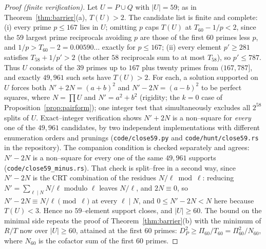 \documentclass[11pt]{article}
\theoremstyle{definition}
\begin{document}
\begin{proof}[Proof (finite verification)]
Let $U=P\cup Q$ with $|U|=59$; as in Theorem~\ref{thm:barrier}(a), $T(U)>2$. The candidate list is
finite and complete: \textup{(i)} every prime $p\le167$ lies in $U$; omitting $p$ caps $T(U)$ at
$T_{60}-1/p<2$, since the $59$ largest prime reciprocals avoiding $p$ are those of the first $60$
primes less $p$, and $1/p>T_{60}-2=0.00590\ldots$ exactly for $p\le167$; \textup{(ii)} every element
$p'\ge281$ satisfies $T_{58}+1/p'>2$ (the other $58$ reciprocals sum to at most $T_{58}$), so
$p'\le787$. Thus $U$ consists of the $39$ primes up to $167$ plus twenty primes from
$(167,787]$, and exactly $49{,}961$ such sets have $T(U)>2$. For each, a solution supported on $U$
forces both $N'+2N=(a+b)^2$ and $N'-2N=(a-b)^2$ to be perfect squares, where $N=\prod U$ and
$N'=a^2+b^2$ (rigidity; the $k=0$ case of Proposition~\ref{prop:pairform}); one integer test that
simultaneously excludes all $2^{58}$ splits of $U$. Exact--integer verification shows $N'+2N$ is a
non--square for \emph{every} one of the $49{,}961$ candidates, by two independent implementations
with different enumeration orders and prunings (\texttt{code/close59.py} and
\texttt{code/hunt/close59.rs} in the repository). The companion condition is checked separately and
agrees: $N'-2N$ is a non--square for every one of the same $49{,}961$ supports
\textup{(\texttt{code/close59\_minus.rs})}. That check is split--free in a second way, since
$N'-2N$ is the CRT combination of the residues $N/\ell\bmod\ell$: reducing $N'=\sum_{\ell\mid N}N/\ell$
modulo $\ell$ leaves $N/\ell$, and $2N\equiv0$, so $N'-2N\equiv N/\ell\pmod\ell$ at every $\ell\mid N$,
and $0\le N'-2N<N$ here because $T(U)<3$. Hence no $59$--element support closes, and
$|U|\ge60$. The bound on the minimal side repeats the proof of Theorem~\ref{thm:barrier}(b) with the
minimum of $R/T$ now over $|U|\ge60$, attained at the first $60$ primes:
$D_P^2\ge\Pi_{60}/T_{60}=\Pi_{60}^2/N_{60}$, where $N_{60}$ is the cofactor sum of the first $60$
primes.
\end{proof}
\end{document}
